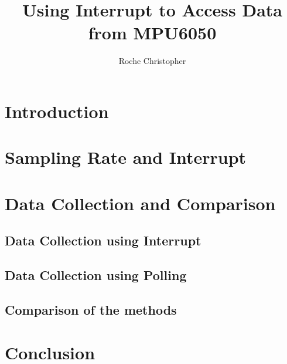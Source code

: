 \documentclass{article}
\title{Using Interrupt to Access Data from MPU6050}
\author{Roche Christopher}
\begin{document}
	\maketitle

	\begin{abstract}
		
	\end{abstract}
	
	\section{Introduction}
	\section{Sampling Rate and Interrupt}
	\section{Data Collection and Comparison}
	\subsection{Data Collection using Interrupt}
	\subsection{Data Collection using Polling}
	\subsection{Comparison of the methods}
	\section{Conclusion}
\end{document}
